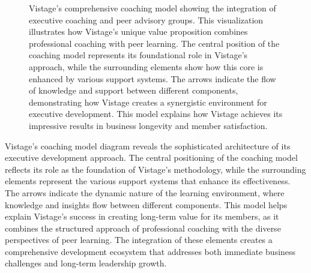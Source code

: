 \documentclass[conference]{IEEEtran}
\begin{document}
\begin{figure}[t]
\centering
{}
\caption{Vistage's comprehensive coaching model showing the integration of executive coaching and peer advisory groups. This visualization illustrates how Vistage's unique value proposition combines professional coaching with peer learning. The central position of the coaching model represents its foundational role in Vistage's approach, while the surrounding elements show how this core is enhanced by various support systems. The arrows indicate the flow of knowledge and support between different components, demonstrating how Vistage creates a synergistic environment for executive development. This model explains how Vistage achieves its impressive results in business longevity and member satisfaction.}
\label{fig:vistage_model}
\end{figure}

Vistage's coaching model diagram reveals the sophisticated architecture of its executive development approach. The central positioning of the coaching model reflects its role as the foundation of Vistage's methodology, while the surrounding elements represent the various support systems that enhance its effectiveness. The arrows indicate the dynamic nature of the learning environment, where knowledge and insights flow between different components. This model helps explain Vistage's success in creating long-term value for its members, as it combines the structured approach of professional coaching with the diverse perspectives of peer learning. The integration of these elements creates a comprehensive development ecosystem that addresses both immediate business challenges and long-term leadership growth.
\end{document}
